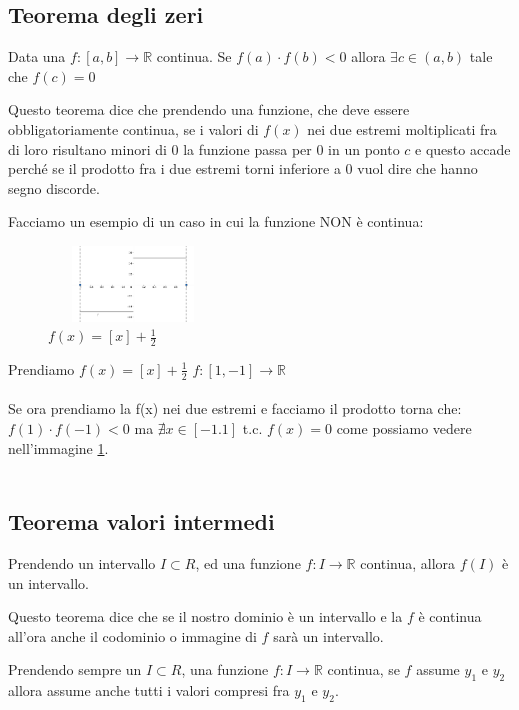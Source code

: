 \subsection{Teorema degli zeri}
\begin{theorem}
    Data una $f: [a, b] \longrightarrow \mathbb{R}$ continua. Se $f(a) \cdot f(b) < 0$ allora $\exists c \in (a, b)$ tale che $f(c) = 0$
\end{theorem}
Questo teorema dice che prendendo una funzione, che deve essere obbligatoriamente continua, se i valori di $f(x)$ nei due estremi moltiplicati fra di loro risultano minori di 0 la funzione passa per 0 in un ponto $c$ e questo accade perché se il prodotto fra i due estremi torni inferiore a 0 vuol dire che hanno segno discorde.\\
\begin{example}
    Facciamo un esempio di un caso in cui la funzione NON è continua:
\end{example}
\begin{figure}
    \vspace{-10pt}
    \centering
    \includegraphics[width=4.5cm, height=2cm]{images/esempio-teorema-zeri.png}
    \caption{$f(x) = [x] + \frac{1}{2}$}
    \label{fig:esempio-teorema-zeri}
\end{figure}
Prendiamo $f(x) = [x] + \frac{1}{2}$ \: $f: [1, -1] \longrightarrow \mathbb{R}$\\ \\
Se ora prendiamo la f(x) nei due estremi e facciamo il prodotto torna che: \\
$f(1) \cdot f(-1) < 0$ ma $\nexists x \in [-1.1]$ t.c. $f(x) = 0$ come possiamo vedere nell'immagine \ref{fig:esempio-teorema-zeri}.\\ \\

\subsection{Teorema valori intermedi}
\begin{theorem}
    Prendendo un intervallo $I \subset R$, ed una funzione $f: I \longrightarrow \mathbb{R}$ continua, allora $f(I)$ è un intervallo.
\end{theorem}
Questo teorema dice che se il nostro dominio è un intervallo e la $f$ è continua all'ora anche il codominio o immagine di $f$ sarà un intervallo.
\begin{corollaries}
    Prendendo sempre un $I \subset R$, una funzione $f: I \longrightarrow \mathbb{R}$ continua, se $f$ assume $y_1$ e $y_2$ allora assume anche tutti i valori compresi fra $y_1$ e $y_2$.
\end{corollaries}

